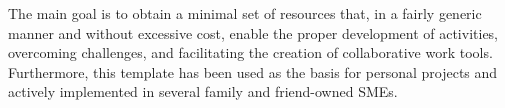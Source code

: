\documentclass[spanish,final]{setup/eetac_tfc_pfc}
\begin{document}
\begin{overview}{10cm}
\newline
The main goal is to obtain a minimal set of resources that, in a fairly generic manner and without excessive cost, enable the proper development of activities, overcoming challenges, and facilitating the creation of collaborative work tools.\newline
\newline
Furthermore, this template has been used as the basis for personal projects and actively implemented in several family and friend-owned SMEs.

\end{overview}


\def\listtablename{Índice de tablas}
\def\tablename{Tabla}%


\afterpreface

\clearpage







%         

\end{document}
